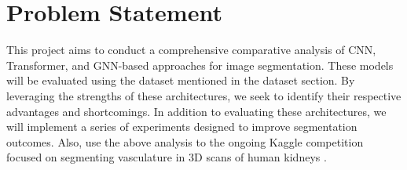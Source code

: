 \section{Problem Statement}
This project aims to conduct a comprehensive comparative analysis of CNN, Transformer, and GNN-based approaches for image segmentation. These models will be evaluated using the dataset mentioned in the dataset section.  By leveraging the strengths of these architectures, we seek to identify their respective advantages and shortcomings. In addition to evaluating these architectures, we will implement a series of experiments designed to improve segmentation outcomes. Also, use the above analysis to the ongoing Kaggle competition focused on segmenting vasculature in 3D scans of human kidneys \cite{kaggle_competition}.